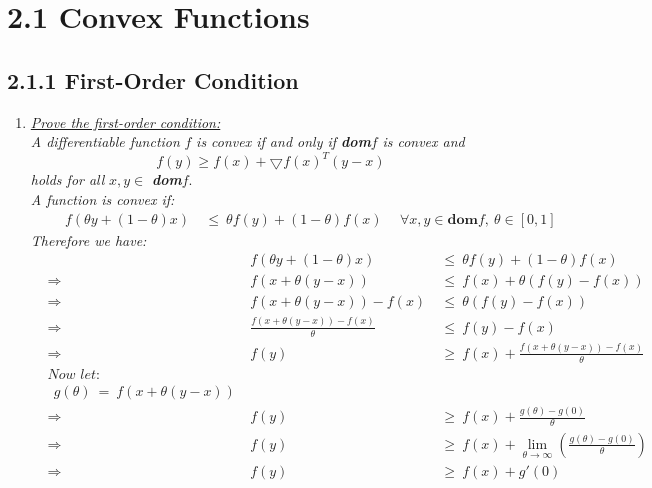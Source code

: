 \documentclass{report}
\begin{document}
	\pagestyle{fancy}
	\hfill \\ \\
	
	\section*{2.1 Convex Functions}
	\subsection*{2.1.1 First-Order Condition}
		\begin{enumerate}[]
			\item \textit{\underline{Prove the first-order condition:}} \\
			\textit{A differentiable function} $f$ \textit{is convex if and only if \textbf{dom}}$f$ \textit{is convex and}
		 	\[
		 	f (y) \geq f (x) + \bigtriangledown f(x)^T(y - x)
		 	\]
		 	\textit{holds for all} $x,y \in$ \textit{\textbf{dom}}$f$. \\
		 	\textit{A function is convex if: }
		 	\begin{align*}
		 		& \ & \ f(\theta y + (1- \theta)x) \ & \leq \ \theta f(y) + (1-\theta) f(x) \ & \ \forall x,y \in \textbf{dom}f, \ \theta \in [0,1] 
		 	\end{align*}
		 	\textit{Therefore we have: }
		 	\begin{align*}
		 		& \ & \ f(\theta y + (1- \theta)x) \ & \leq \ \theta f(y) + (1-\theta) f(x) \\
		 		& \Rightarrow & \ f (x + \theta (y-x)) \ & \leq  \ f(x) + \theta (f(y) - f(x)) \\
		 		& \Rightarrow & \ f (x + \theta (y-x)) - f(x) \ & \leq  \ \theta (f(y) - f(x)) \\
		 		& \Rightarrow & \ \frac{f (x + \theta (y-x)) - f(x)}{\theta} \ & \leq  \ f(y) - f(x) \\
		 		& \Rightarrow & \ f(y) \ & \geq \ f(x) + \frac{f (x + \theta (y-x)) - f(x)}{\theta} \\
		 		& \textit{Now let:} \\
		 		& \ \ g(\theta) \ = \ f(x + \theta (y-x)) \\
		 		& \Rightarrow & \ f(y) \ & \geq \ f(x) + \frac{g(\theta) - g(0)}{\theta} \\
		 		& \Rightarrow & \ f(y) \ & \geq \ f(x) + \lim_{\theta \rightarrow \infty} \left(\frac{g(\theta) - g(0)}{\theta}\right) \\
		 		& \Rightarrow & \ f(y) \ & \geq \ f(x) + g'(0) \\

\end{align*}
\end{enumerate}
\end{document}
